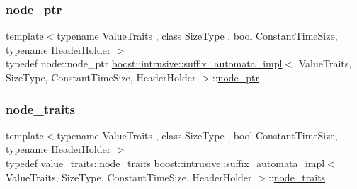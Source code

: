 \mbox{\label{classboost_1_1intrusive_1_1suffix__automata__impl_ab2d4128c7fc9c5ba87fa9eb5d50c318a}} 
\subsubsection{\texorpdfstring{node\+\_\+ptr}{node\_ptr}}
{\footnotesize\ttfamily template$<$typename Value\+Traits , class Size\+Type , bool Constant\+Time\+Size, typename Header\+Holder $>$ \\
typedef node\+::node\+\_\+ptr \hyperlink{classboost_1_1intrusive_1_1suffix__automata__impl}{boost\+::intrusive\+::suffix\+\_\+automata\+\_\+impl}$<$ Value\+Traits, Size\+Type, Constant\+Time\+Size, Header\+Holder $>$\+::\hyperlink{classboost_1_1intrusive_1_1suffix__automata__impl_ab2d4128c7fc9c5ba87fa9eb5d50c318a}{node\+\_\+ptr}}

\mbox{\label{classboost_1_1intrusive_1_1suffix__automata__impl_a3bf4d50a1aa7e13e6d6ded62d04a0296}} 
\subsubsection{\texorpdfstring{node\+\_\+traits}{node\_traits}}
{\footnotesize\ttfamily template$<$typename Value\+Traits , class Size\+Type , bool Constant\+Time\+Size, typename Header\+Holder $>$ \\
typedef value\+\_\+traits\+::node\+\_\+traits \hyperlink{classboost_1_1intrusive_1_1suffix__automata__impl}{boost\+::intrusive\+::suffix\+\_\+automata\+\_\+impl}$<$ Value\+Traits, Size\+Type, Constant\+Time\+Size, Header\+Holder $>$\+::\hyperlink{classboost_1_1intrusive_1_1suffix__automata__impl_a3bf4d50a1aa7e13e6d6ded62d04a0296}{node\+\_\+traits}}

\mbox{\label{classboost_1_1intrusive_1_1suffix__automata__impl_aa30039fa797b95a84660985ab506f6ef}} 
